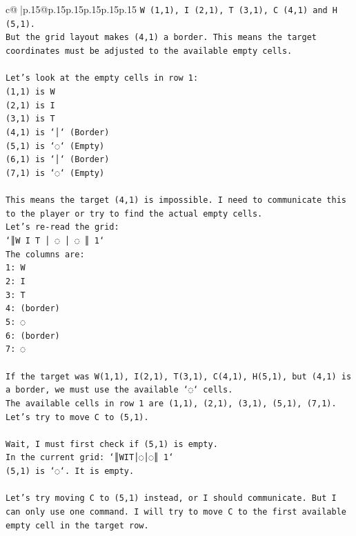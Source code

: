 \documentclass{article}
\begin{document}
{\begin{supertabular}{c@{$\;$}|p{.15\linewidth}@{}p{.15\linewidth}p{.15\linewidth}p{.15\linewidth}p{.15\linewidth}p{.15\linewidth}}
{{{\texttt{W (1,1), I (2,1), T (3,1), C (4,1) and H (5,1).} \\
\texttt{But the grid layout makes (4,1) a border. This means the target coordinates must be adjusted to the available empty cells.} \\
\\ 
\texttt{Let's look at the empty cells in row 1:} \\
\texttt{(1,1) is W} \\
\texttt{(2,1) is I} \\
\texttt{(3,1) is T} \\
\texttt{(4,1) is `│` (Border)} \\
\texttt{(5,1) is `◌` (Empty)} \\
\texttt{(6,1) is `│` (Border)} \\
\texttt{(7,1) is `◌` (Empty)} \\
\\ 
\texttt{This means the target (4,1) is impossible. I need to communicate this to the player or try to find the actual empty cells.} \\
\texttt{Let's re{-}read the grid:} \\
\texttt{`║W I T │ ◌ │ ◌ ║ 1`} \\
\texttt{The columns are:} \\
\texttt{1: W} \\
\texttt{2: I} \\
\texttt{3: T} \\
\texttt{4: (border)} \\
\texttt{5: ◌} \\
\texttt{6: (border)} \\
\texttt{7: ◌} \\
\\ 
\texttt{If the target was W(1,1), I(2,1), T(3,1), C(4,1), H(5,1), but (4,1) is a border, we must use the available `◌` cells.} \\
\texttt{The available cells in row 1 are (1,1), (2,1), (3,1), (5,1), (7,1).} \\
\texttt{Let's try to move C to (5,1).} \\
\\ 
\texttt{Wait, I must first check if (5,1) is empty.} \\
\texttt{In the current grid: `║WIT│◌│◌║ 1`} \\
\texttt{(5,1) is `◌`. It is empty.} \\
\\ 
\texttt{Let's try moving C to (5,1) instead, or I should communicate. But I can only use one command. I will try to move C to the first available empty cell in the target row.} \\
}}}
\end{supertabular}}
\end{document}
